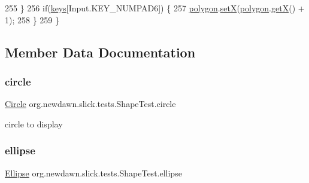 \begin{DoxyCode}
255         \}
256         \textcolor{keywordflow}{if}(\mbox{\hyperlink{classorg_1_1newdawn_1_1slick_1_1tests_1_1_shape_test_abd8d1f480191272d0dc2ad5c9afe14fc}{keys}}[Input.KEY\_NUMPAD6]) \{
257             \mbox{\hyperlink{classorg_1_1newdawn_1_1slick_1_1tests_1_1_shape_test_a7a0198760bc6648bf9c28d35b102b7f1}{polygon}}.\mbox{\hyperlink{classorg_1_1newdawn_1_1slick_1_1geom_1_1_polygon_a9a974909df2106f648e7588b2e288c77}{setX}}(\mbox{\hyperlink{classorg_1_1newdawn_1_1slick_1_1tests_1_1_shape_test_a7a0198760bc6648bf9c28d35b102b7f1}{polygon}}.\mbox{\hyperlink{classorg_1_1newdawn_1_1slick_1_1geom_1_1_shape_a736a47bfdd6f164558b43fd497a3a3f3}{getX}}() + 1);
258         \}
259     \}
\end{DoxyCode}


\subsection{Member Data Documentation}
\mbox{\label{classorg_1_1newdawn_1_1slick_1_1tests_1_1_shape_test_a61f5576f235a808e5a41242bedefbca0}} 
\subsubsection{\texorpdfstring{circle}{circle}}
{\footnotesize\ttfamily \mbox{\hyperlink{classorg_1_1newdawn_1_1slick_1_1geom_1_1_circle}{Circle}} org.\+newdawn.\+slick.\+tests.\+Shape\+Test.\+circle\hspace{0.3cm}{\ttfamily [private]}}

circle to display \mbox{\label{classorg_1_1newdawn_1_1slick_1_1tests_1_1_shape_test_a0337285e2634a3c36400453a8f963757}} 
\subsubsection{\texorpdfstring{ellipse}{ellipse}}
{\footnotesize\ttfamily \mbox{\hyperlink{classorg_1_1newdawn_1_1slick_1_1geom_1_1_ellipse}{Ellipse}} org.\+newdawn.\+slick.\+tests.\+Shape\+Test.\+ellipse\hspace{0.3cm}{\ttfamily [private]}}

